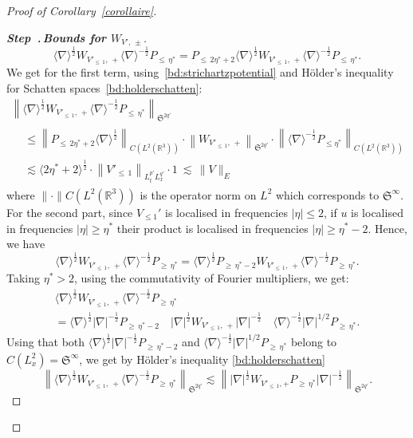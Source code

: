 \documentclass[10pt]{amsart}
\theoremstyle{definition}\newtheorem{defi}[theo]{Definition}\newtheorem{rema}[theo]{Remark}\newtheorem{exam}[theo]{Example}\newtheorem{exem}[theo]{Example}\newtheorem{nota}[theo]{Notation}
\newcommand{\R}{\mathbb{R}}
\newcommand{\frkS}{\mathfrak{S}}
\newcommand{\an}[1]{\langle #1 \rangle}
\newcounter{stepcount}
\newenvironment{step}[1]{\refstepcounter{stepcount}\begin{proof}[{\bf{Step~\thestepcount}{.\,\emph{#1}}}]}{\let\qed\relax\end{proof}}
\begin{document}
\begin{proof}[Proof of Corollary~\ref{corollaire}]
\begin{step}{{Bounds for $W_{V',\,\pm}$}}
\[
\an{\nabla}^{\frac12} W_{V'_{\leq\,1},\,+}\an{\nabla}^{-\frac12} P_{\leq\,\eta^*} = P_{\leq\,2\eta^*+2} \an{\nabla}^{\frac12} W_{V'_{\leq\,1},\,+}\an{\nabla}^{-\frac12} P_{\leq\,\eta^*}.
\]
We get for the first term, using~\eqref{bd:strichartzpotential} and H\"older's inequality for Schatten spaces~\eqref{bd:holderschatten}:
\begin{multline}\label{bc:interWV2}
\left\| \langle \nabla \rangle^{\frac 12}W_{V'_{\leq\, 1},\,+} \langle \nabla \rangle^{-\frac 12} P_{\leq\, \eta^*}\right\|_{\frkS^{2q'}}
\\
\begin{aligned}
&\leq \left\| P_{\leq\,2\eta^* +2}\langle \nabla \rangle^{\frac 12}\right\|_{C\left(L^2\left(\R^3\right)\right)} \cdot \left\| W_{V'_{\leq\,1},\,+} \right\|_{\frkS^{2q'}} \cdot \left\| \langle \nabla \rangle^{-\frac 12} P_{\leq \eta^*}\right\|_{C\left(L^2\left(\R^3\right)\right)}\\
&\lesssim \an{2 \eta^* + 2}^{\frac12} \cdot \left\| V'_{\leq\,1} \right\|_{L^{p'}_tL^{q'}_x}\cdot 1 \ \lesssim \, \| V\|_{E}
\end{aligned}
\end{multline}
where $ \|\cdot \|{C(L^2(\R^3))}$ is the operator norm on $L^2$ which corresponds to $\frkS^\infty$. For the second part, since $V_{\leq 1}'$ is localised in frequencies $|\eta|\leq 2$, if $u$ is localised in frequencies $|\eta|\geq \eta^*$ their product is localised in frequencies $|\eta|\geq \eta^* -2$. Hence, we have
\[
\langle \nabla \rangle^{\frac 12}W_{V'_{\leq\,1},\,+} \langle \nabla \rangle^{-\frac 12} P_{\geq\,\eta^*} = \langle \nabla \rangle^{\frac 12}P_{\geq\,\eta^* -2}W_{V'_{\leq\,1},\,+} \langle \nabla \rangle^{-\frac 12} P_{\geq\,\eta^*}.
\]
Taking $\eta^* > 2$, using the commutativity of Fourier multipliers, we get:
\begin{multline*}
\langle \nabla \rangle^{\frac 12}W_{V'_{\leq\,1},\,+} \langle \nabla \rangle^{-\frac 12} P_{\geq\,\eta^*}\\
= \langle \nabla \rangle^{\frac 12} |\nabla|^{-\frac12}P_{\geq\,\eta^* -2} \quad |\nabla|^{\frac12} W_{V'_{\leq\,1},\,+} |\nabla|^{-\frac12}\quad \langle \nabla \rangle^{-\frac 12}|\nabla|^{1/2} P_{\geq\, \eta^*}.
\end{multline*}
Using that both $ \langle \nabla \rangle^{\frac 12} |\nabla|^{-\frac12}P_{\geq\,\eta^* -2} $ and $\langle \nabla \rangle^{-\frac 12}|\nabla|^{1/2} P_{\geq \,\eta^*}$ belong to $C(L^2_x) = \frkS^\infty$, we get by H\"older's inequality \eqref{bd:holderschatten}
\[
\left\| \langle \nabla \rangle^{\frac 12}W_{V'_{\leq\, 1},\,+} \langle \nabla \rangle^{-\frac 12} P_{\geq \,\eta^*} \right\|_{\frkS^{2q'}}\lesssim \left\| |\nabla |^{\frac 12}W_{V'_{\leq\,1},+}P_{\geq\,\eta^*} |\nabla |^{-\frac 12} \right\|_{\frkS^{2q'}}.
\]
\end{step}
\end{proof}
\end{document}
